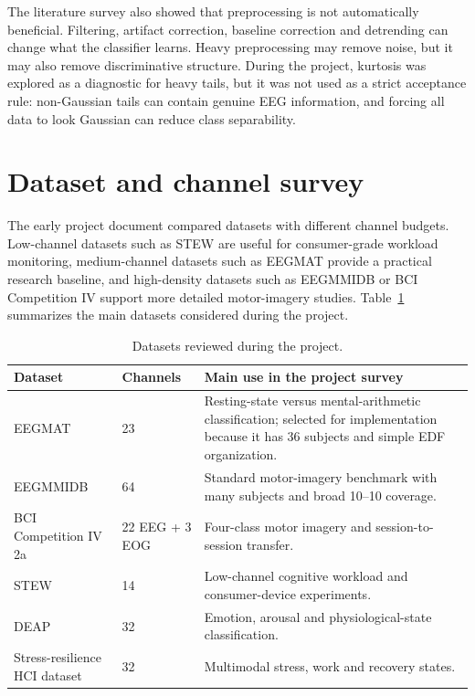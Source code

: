 \documentclass[10pt,a4paper,openright]{report}
\begin{document}
The literature survey also showed that preprocessing is not automatically beneficial. Filtering, artifact correction, baseline correction and detrending can change what the classifier learns. Heavy preprocessing may remove noise, but it may also remove discriminative structure. During the project, kurtosis was explored as a diagnostic for heavy tails, but it was not used as a strict acceptance rule: non-Gaussian tails can contain genuine EEG information, and forcing all data to look Gaussian can reduce class separability.

\section{Dataset and channel survey}
The early project document compared datasets with different channel budgets. Low-channel datasets such as STEW are useful for consumer-grade workload monitoring, medium-channel datasets such as EEGMAT provide a practical research baseline, and high-density datasets such as EEGMMIDB or BCI Competition IV support more detailed motor-imagery studies. Table~\ref{tab:dataset-survey} summarizes the main datasets considered during the project.

\begin{table}[H]
\centering
\small
\caption{Datasets reviewed during the project.}
\label{tab:dataset-survey}
\begin{tabularx}{\textwidth}{p{}p{}X}
\toprule
Dataset & Channels & Main use in the project survey \\
\midrule
EEGMAT & 23 & Resting-state versus mental-arithmetic classification; selected for implementation because it has 36 subjects and simple EDF organization. \\
EEGMMIDB & 64 & Standard motor-imagery benchmark with many subjects and broad 10--10 coverage. \\
BCI Competition IV 2a & 22 EEG + 3 EOG & Four-class motor imagery and session-to-session transfer. \\
STEW & 14 & Low-channel cognitive workload and consumer-device experiments. \\
DEAP & 32 & Emotion, arousal and physiological-state classification. \\
Stress-resilience HCI dataset & 32 & Multimodal stress, work and recovery states. \\
\bottomrule
\end{tabularx}
\end{table}
\end{document}
